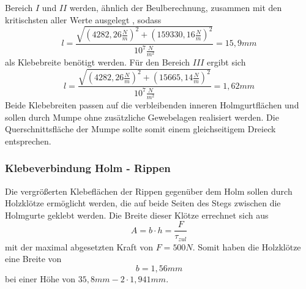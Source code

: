 \noindent Bereich $I$ und $II$ werden, ähnlich der Beulberechnung, zusammen mit den kritischsten aller Werte ausgelegt , sodass 
\begin{equation}
	l=\frac{\sqrt{(4282,26\frac{N}{m})^{2}+(159330,16\frac{N}{m})^{2}}}{10^{7}\frac{N}{m^{2}}}=15,9mm
\end{equation}
als Klebebreite benötigt werden. Für den Bereich $III$ ergibt sich
\begin{equation}
	l=\frac{\sqrt{(4282,26\frac{N}{m})^{2}+(15665,14\frac{N}{m})^{2}}}{10^{7}\frac{N}{m^{2}}}=1,62mm
\end{equation}
Beide Klebebreiten passen auf die verbleibenden inneren Holmgurtflächen und sollen durch Mumpe ohne zusätzliche Gewebelagen realisiert werden. Die Querschnittsfläche der Mumpe sollte somit einem gleichseitigem Dreieck entsprechen.

\subsubsection{Klebeverbindung Holm - Rippen}
Die vergrößerten Klebeflächen der Rippen gegenüber dem Holm sollen durch Holzklötze ermöglicht werden, die auf beide Seiten des Stegs zwischen die Holmgurte geklebt werden. Die Breite dieser Klötze errechnet sich aus 
\begin{equation}
	A=b\cdot h=\frac{F}{\tau_{zul}}
\end{equation}
mit der maximal abgesetzten Kraft von $F=500N$.
Somit haben die Holzklötze eine Breite von 
\begin{equation}
	b=1,56mm
\end{equation}
bei einer Höhe von $35,8mm-2\cdot 1,941mm$.